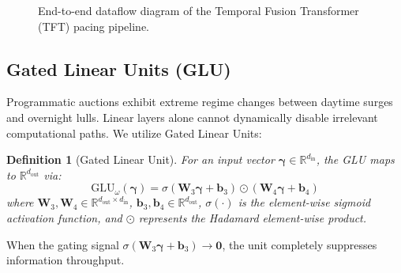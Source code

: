 \documentclass[11pt,a4paper]{article}
\newtheorem{definition}[theorem]{Definition}
\begin{document}
\begin{figure}[t]
\caption{End-to-end dataflow diagram of the Temporal Fusion Transformer (TFT) pacing pipeline.}
\label{fig:tft_flow}
\end{figure}

\subsection{Gated Linear Units (GLU)}
Programmatic auctions exhibit extreme regime changes between daytime surges and overnight lulls. Linear layers alone cannot dynamically disable irrelevant computational paths. We utilize Gated Linear Units:
\begin{definition}[Gated Linear Unit]
For an input vector $\boldsymbol{\gamma} \in \mathbb{R}^{d_{\text{in}}}$, the GLU maps to $\mathbb{R}^{d_{\text{out}}}$ via:
\begin{equation}
    \mathrm{GLU}_\omega(\boldsymbol{\gamma}) = \sigma\left(\mathbf{W}_3 \boldsymbol{\gamma} + \mathbf{b}_3\right) \odot \left(\mathbf{W}_4 \boldsymbol{\gamma} + \mathbf{b}_4\right)
\end{equation}
where $\mathbf{W}_3, \mathbf{W}_4 \in \mathbb{R}^{d_{\text{out}} \times d_{\text{in}}}$, $\mathbf{b}_3, \mathbf{b}_4 \in \mathbb{R}^{d_{\text{out}}}$, $\sigma(\cdot)$ is the element-wise sigmoid activation function, and $\odot$ represents the Hadamard element-wise product.
\end{definition}
When the gating signal $\sigma(\mathbf{W}_3 \boldsymbol{\gamma} + \mathbf{b}_3) \to \mathbf{0}$, the unit completely suppresses information throughput.
\end{document}
